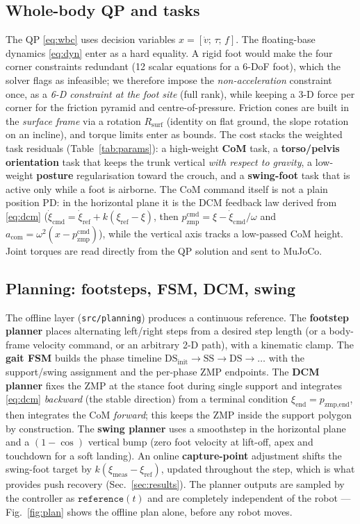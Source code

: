 \documentclass[11pt]{article}
\begin{document}
\subsection{Whole-body QP and tasks}
\label{sec:impl:wbc}
The QP \eqref{eq:wbc} uses decision variables $x=[\dot v;\,\tau;\,f]$. The
floating-base dynamics \eqref{eq:dyn} enter as a hard equality. A rigid foot would
make the four corner constraints redundant (12 scalar equations for a 6-DoF foot),
which the solver flags as infeasible; we therefore impose the
\emph{non-acceleration} constraint once, as a \emph{6-D constraint at the foot
site} (full rank), while keeping a 3-D force per corner for the friction
pyramid and centre-of-pressure. Friction cones are built in the \emph{surface
frame} via a rotation $R_{\text{surf}}$ (identity on flat ground, the slope
rotation on an incline), and torque limits enter as bounds. The cost stacks the
weighted task residuals (Table~\ref{tab:params}): a high-weight \textbf{CoM} task,
a \textbf{torso/pelvis orientation} task that keeps the trunk vertical
\emph{with respect to gravity}, a low-weight \textbf{posture} regularisation toward
the crouch, and a \textbf{swing-foot} task that is active only while a foot is
airborne. The CoM command itself is not a plain position PD: in the horizontal
plane it is the DCM feedback law derived from \eqref{eq:dcm}
($\dot\xi_{\text{cmd}}=\dot\xi_{\text{ref}}+k(\xi_{\text{ref}}-\xi)$, then
$p_{\text{zmp}}^{\text{cmd}}=\xi-\dot\xi_{\text{cmd}}/\omega$ and
$a_{\text{com}}=\omega^2(x-p_{\text{zmp}}^{\text{cmd}})$), while the vertical axis
tracks a low-passed CoM height. Joint torques are read directly from the QP
solution and sent to MuJoCo.

\subsection{Planning: footsteps, FSM, DCM, swing}
\label{sec:impl:plan}
The offline layer (\texttt{src/planning}) produces a continuous reference. The
\textbf{footstep planner} places alternating left/right steps from a desired step
length (or a body-frame velocity command, or an arbitrary 2-D path), with a
kinematic clamp. The \textbf{gait FSM} builds the phase timeline
$\text{DS}_{\text{init}}\!\to\!\text{SS}\!\to\!\text{DS}\!\to\!\dots$ with the
support/swing assignment and the per-phase ZMP endpoints. The \textbf{DCM planner}
fixes the ZMP at the stance foot during single support and integrates
\eqref{eq:dcm} \emph{backward} (the stable direction) from a terminal condition
$\xi_{\text{end}}=p_{\text{zmp,end}}$, then integrates the CoM \emph{forward}; this
keeps the ZMP inside the support polygon by construction. The \textbf{swing planner}
uses a smoothstep in the horizontal plane and a $(1-\cos)$ vertical bump (zero foot
velocity at lift-off, apex and touchdown for a soft landing). An online
\textbf{capture-point} adjustment shifts the swing-foot target by
$k(\xi_{\text{meas}}-\xi_{\text{ref}})$, updated throughout the step, which is what
provides push recovery (Sec.~\ref{sec:results}). The planner outputs are sampled by
the controller as $\texttt{reference}(t)$ and are completely independent of the
robot --- Fig.~\ref{fig:plan} shows the offline plan alone, before any robot moves.
\end{document}
